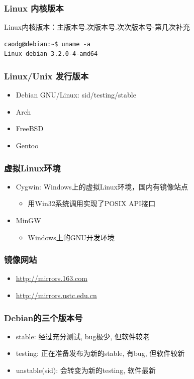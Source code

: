 \documentclass[compress]{beamer}
\begin{document}
\begin{frame}[containsverbatim]
\frametitle{Linux 内核版本}
\noindent Linux内核版本：主版本号.次版本号.次次版本号-第几次补充

\begin{Verbatim}
caodg@debian:~$ uname -a
Linux debian 3.2.0-4-amd64
\end{Verbatim}

\end{frame}

\begin{frame}
    \frametitle {Linux/Unix 发行版本}
\begin{itemize}
  \item {Debian GNU/Linux: sid/testing/stable}
  \item {Arch}
  \item {FreeBSD}
  \item {Gentoo}
\end{itemize}
\end{frame}

\begin{frame}
  \frametitle{虚拟Linux环境}
  \begin{itemize}
\item Cygwin: Windows上的虚拟Linux环境，国内有镜像站点
\begin{itemize}
  \item 用Win32系统调用实现了POSIX API接口
\end{itemize}

\item MinGW
  \begin{itemize}
	\item Windows上的GNU开发环境
  \end{itemize}
\end{itemize}

\end{frame}

\begin{frame}
    \frametitle{镜像网站}
    \begin{itemize}
        \item \href{http://mirrors.163.com}{http://mirrors.163.com}
        \item \href{http://mirrors.ustc.edu.cn}{http://mirrors.ustc.edu.cn}
    \end{itemize}
\end{frame}

\begin{frame}
    \frametitle{Debian的三个版本号}
    \begin{itemize}
        \item stable: 经过充分测试, bug极少, 但软件较老
        \item testing: 正在准备发布为新的stable, 有bug, 但软件较新
        \item unstable(sid): 会转变为新的testing, 软件最新
\end{itemize}
\end{frame}
\end{document}
